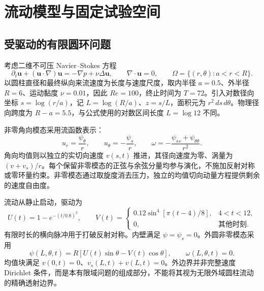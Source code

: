 \section{流动模型与固定试验空间}
\label{sec:governing-equations}
\label{sec:space-discretization}

\subsection{受驱动的有限圆环问题}

考虑二维不可压 Navier--Stokes 方程
\begin{equation}
 \partial_t\boldsymbol u+(\boldsymbol u\cdot\nabla)\boldsymbol u
 =-\nabla p+\nu\Delta\boldsymbol u,\qquad
 \nabla\cdot\boldsymbol u=0,\qquad
 \Omega=\{(r,\theta):a<r<R\}.
 \label{eq:ns}
\end{equation}
以圆柱直径和最终纵向来流速度为长度与速度尺度，取内半径 \(a=0.5\)、外半径 \(R=6\)、运动黏度 \(\nu=0.01\)，因此 \(Re=100\)，终止时间为 \(T=72\)。引入对数径向坐标 \(s=\log(r/a)\)，记 \(L=\log(R/a)\)、\(z=s/L\)，面积元为 \(r^2\,ds\,d\theta\)。物理径向跨度为 $R-a=5.5$，与公式使用的对数区间长度 $L=\log12$ 不同。

非零角向模态采用流函数表示：
\begin{equation}
 u_r=\frac{\psi_\theta}{r},\qquad
 u_\theta=-\frac{\psi_s}{r},\qquad
 \omega=-\frac{\psi_{ss}+\psi_{\theta\theta}}{r^2}.
 \label{eq:kinematics}
\end{equation}
角向均值则以独立的实切向速度 \(v(s,t)\) 推进，其径向速度为零、涡量为 \((v+v_s)/r\)。每个保留非零模态的正弦与余弦分量均参与演化，不施加反射对称或零环量约束。非零模态通过取旋度消去压力，独立的均值切向动量方程提供剩余的速度自由度。

流动从静止启动，驱动为
\begin{equation}
 U(t)=1-e^{-(t/0.8)^3},\qquad
 V(t)=\begin{cases}
 0.12\sin^4[\pi(t-4)/8],&4<t<12,\\
 0,&\text{其他时刻}.
 \end{cases}
 \label{eq:driving}
\end{equation}
有限时长的横向脉冲用于打破反射对称。内壁满足 \(\psi=\psi_s=0\)。外圆非零模态采用
\begin{equation}
 \psi(L,\theta,t)=R[U(t)\sin\theta-V(t)\cos\theta],\qquad
 \omega(L,\theta,t)=0.
 \label{eq:outer-boundary}
\end{equation}
均值块满足 \(v(0,t)=0\)、\(v_s(L,t)+v(L,t)=0\)。外边界并非完整速度 Dirichlet 条件，而是本有限域问题的组成部分，不能将其视为无限外域圆柱流动的精确透射边界。


